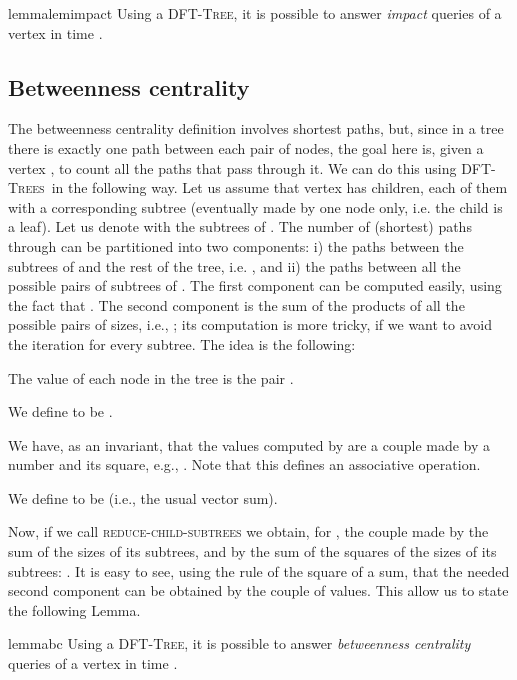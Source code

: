 \documentclass[a4paper,USenglish]{lipics}
\newcommand{\dft}{\textsc{DFT-Tree}}
\newcommand{\dfts}{\textsc{DFT-Trees}}
\begin{document}
\begin{restatable}{lemma}{lemimpact}
Using a \dft, it is possible to answer \emph{impact} queries of a vertex in time .
\end{restatable}

\subsection{Betweenness centrality}

The betweenness centrality definition involves shortest paths, but, since in  a tree there is exactly one path between each pair of nodes, the goal here is, given a vertex , to count all the paths that pass through it. We can do this using \dfts\ in the following way. Let us assume that vertex  has  children, each of them with a corresponding subtree (eventually made by one node only, i.e. the child is a leaf). Let us denote with  the subtrees of . The number of (shortest) paths through  can be partitioned into two  components: i) the paths between the subtrees of  and the rest of the tree, i.e. , and ii) the paths between all the possible pairs of subtrees of . The first component can be computed easily, using the fact that  . The second component is the sum of the products of all the possible pairs of sizes, i.e., ; its computation is more tricky, if we want to avoid the iteration for every subtree. The idea is the following: 
\begin{compactitem}
				\item The value of each node in the tree is the pair .
				\item We define  to be .
				\item We have, as an invariant, that the values computed by   are a couple made by a number and its square, e.g., . Note that this defines an associative operation.
				\item We define  to be  (i.e., the usual vector sum). 
			\end{compactitem}
Now, if we call \textsc{reduce-child-subtrees} we obtain, for , the couple made by the sum of the sizes of its subtrees, and by the sum of the squares of the sizes of its subtrees: . It is easy to see, using the rule of the square of a sum, that the needed second component can be obtained by the couple of values. This allow us to state the following Lemma.
\begin{restatable}{lemma}{bc}
Using a \dft, it is possible to answer \emph{betweenness centrality} queries of a vertex  in time .
\end{restatable}
\end{document}

